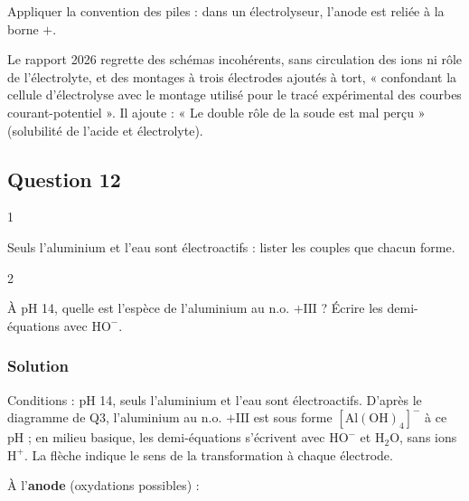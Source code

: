 \documentclass[11pt,a4paper]{article}
\newcommand{\equationajustee}[1]{%
  \sbox{\boiteequation}{$\displaystyle #1$}%
  \ifdim\wd\boiteequation>\linewidth
    \[\resizebox{\linewidth}{!}{\usebox{\boiteequation}}\]%
  \else
    \[#1\]%
  \fi}
\begin{document}
\begin{piege}

Appliquer la convention des piles : dans un électrolyseur, l'anode est reliée à la borne \(+\).

\end{piege}

\begin{jury}

Le rapport 2026 regrette des schémas incohérents, sans circulation des ions ni rôle de l'électrolyte, et des montages à trois électrodes ajoutés à tort, « confondant la cellule d'électrolyse avec le montage utilisé pour le tracé expérimental des courbes courant-potentiel ». Il ajoute : « Le double rôle de la soude est mal perçu » (solubilité de l'acide et électrolyte).

\end{jury}

\hypertarget{question-12}{%
\subsection{Question 12}\label{question-12}}

\begin{indication}{1}

Seuls l'aluminium et l'eau sont électroactifs : lister les couples que chacun forme.

\end{indication}

\begin{indication}{2}

À pH 14, quelle est l'espèce de l'aluminium au n.o. \(+\mathrm{III}\) ? Écrire les demi-équations avec \(\mathrm{HO^-}\).

\end{indication}

\hypertarget{solution-11}{%
\subsubsection{Solution}\label{solution-11}}

Conditions : pH 14, seuls l'aluminium et l'eau sont électroactifs. D'après le diagramme de Q3, l'aluminium au n.o. \(+\mathrm{III}\) est sous forme \([\mathrm{Al(OH)_4}]^-\) à ce pH ; en milieu basique, les demi-équations s'écrivent avec \(\mathrm{HO^-}\) et \(\mathrm{H_2O}\), sans ions \(\mathrm{H^+}\). La flèche indique le sens de la transformation à chaque électrode.

À l'\textbf{anode} (oxydations possibles) :
\equationajustee{\mathrm{Al(s)}+4\,\mathrm{HO^-}\longrightarrow[\mathrm{Al(OH)_4}]^-+3\,e^-}
\equationajustee{4\,\mathrm{HO^-}\longrightarrow\mathrm{O_2(g)}+2\,\mathrm{H_2O}+4\,e^-}
\end{document}
